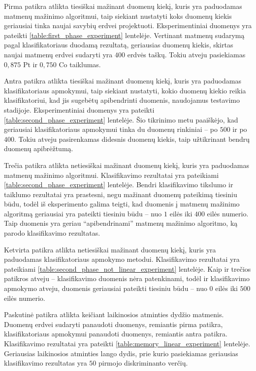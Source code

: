 \documentclass[]{vgtuef}
\begin{document}
Pirma patikra atlikta tiesiškai mažinant duomenų kiekį, kuris yra paduodamas matmenų mažinimo algoritmui, taip siekiant nustatyti koks duomenų kiekis geriausiai tinka naujai savybių erdvei projektuoti. Eksperimentiniai duomenys yra pateikti \ref{table:first_phase_experiment} lentelėje. Vertinant matmenų sudarymą pagal klasifikatoriaus duodamą rezultatą, geriausias duomenų kiekis, skirtas naujai matmenų erdvei sudaryti yra $400$ erdvės taškų. Tokiu atveju pasiekiamas $0,875$ Pt ir $0,750$ Co taiklumas. 

Antra patikra atlikta tiesiškai mažinant duomenų kiekį, kuris yra paduodamas klasifikatoriaus apmokymui, taip siekiant nustatyti, kokio duomenų kiekio reikia klasifikatoriui, kad jis sugebėtų apibendrinti duomenis, naudojamus testavimo stadijoje. Eksperimentiniai duomenys yra pateikti \ref{table:second_phase_experiment} lentelėje. Šio tikrinimo metu paaiškėjo, kad geriausiai klasifikatoriaus apmokymui tinka du duomenų rinkiniai -- po $500$ ir po $400$. Tokiu atveju pasirenkamas didesnis duomenų kiekis, taip užtikrinant bendrų duomenų apibrėžtumą.

Trečia patikra atlikta netiesiškai mažinant duomenų kiekį, kuris yra paduodamas matmenų mažinimo algoritmui. Klasifikavimo rezultatai yra pateikiami \ref{table:second_phase_experiment} lentelėje. Bendri klasifikavimo tikslumo ir taiklumo rezultatai yra prastesni, negu mažinant duomenų pateikimą tiesiniu būdu, todėl iš eksperimento galima teigti, kad duomenis į matmenų mažinimo algoritmą geriausiai yra pateikti tiesiniu būdu -- nuo $1$ eilės iki $400$ eilės numerio. Taip duomenis yra geriau ``apibendrinami'' matmenų mažinimo algoritmo, ką parodo klasifikavimo rezultatas.

Ketvirta patikra atlikta netiesiškai mažinant duomenų kiekį, kuris yra paduodamas klasifikatoriaus apmokymo metodui. Klasifikavimo rezultatai yra pateikiami \ref{table:second_phase_not_linear_experiment} lentelėje. Kaip ir trečios patikros atveju -- klasifikavimo duomenis nėra patenkinami, todėl ir klasifikavimo apmokymo atveju, duomenis geriausiai pateikti tiesiniu būdu -- nuo $0$  eilės iki $500$ eilės numerio.

Paskutinė patikra atlikta keičiant laikinosios atminties dydžio matmenis. Duomenų erdvei sudaryti panaudoti duomenys, remiantis pirma patikra, klasifikatoriaus apmokymui panaudoti duomenys, remiantis antra patikra. Klasifikavimo rezultatai yra pateikti \ref{table:memory_linear_experiment} lentelėje. Geriausias laikinosios atminties lango dydis, prie kurio pasiekiamas geriausias klasifikavimo rezultatas yra $50$ pirmojo diskriminanto verčių.
\end{document}
